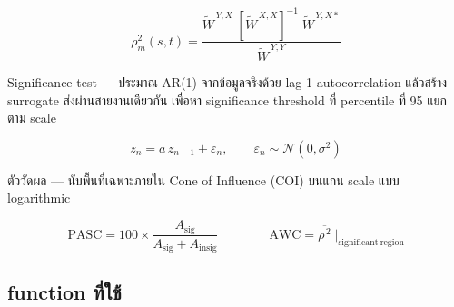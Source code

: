 \documentclass[a4paper,12pt]{article}
\begin{document}
\begin{equation*}
  \rho_m^2(s,t)=\frac{\widetilde{W}^{\,Y,X}\;\left[\widetilde{W}^{\,X,X}\right]^{-1}\;\widetilde{W}^{\,Y,X*}}
  {\widetilde{W}^{\,Y,Y}}
\end{equation*}

Significance test --- ประมาณ AR(1) จากข้อมูลจริงด้วย lag-1 autocorrelation
แล้วสร้าง surrogate ส่งผ่านสายงานเดียวกัน เพื่อหา significance threshold ที่ percentile
ที่ 95 แยกตาม scale

\begin{equation*}
  z_n = a\,z_{n-1} + \varepsilon_n,\qquad \varepsilon_n \sim \mathcal{N}(0,\sigma^2)
\end{equation*}

ตัววัดผล --- นับพื้นที่เฉพาะภายใน Cone of Influence (COI) บนแกน scale แบบ logarithmic

\begin{equation*}
  \mathrm{PASC}=100\times\frac{A_{\mathrm{sig}}}{A_{\mathrm{sig}}+A_{\mathrm{insig}}}
  \qquad\qquad
  \mathrm{AWC}=\overline{\rho^{\,2}}\;\Big|_{\mathrm{significant\ region}}
\end{equation*}
\clearpage
\subsection{function ที่ใช้}
\end{document}
